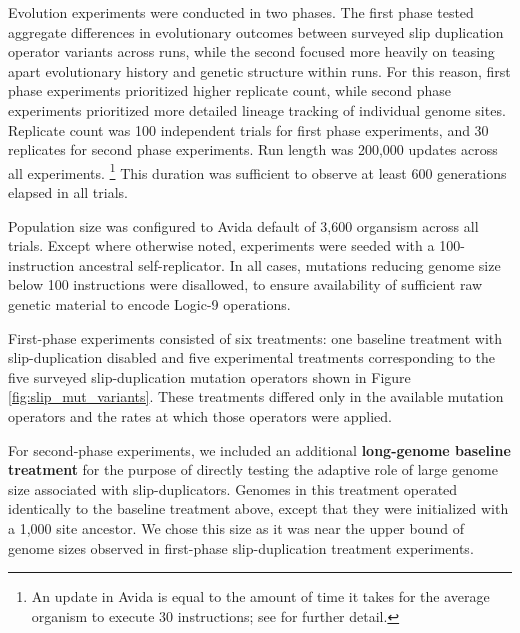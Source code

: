 Evolution experiments were conducted in two phases.
The first phase tested aggregate differences in evolutionary outcomes between surveyed slip duplication operator variants across runs, while the second focused more heavily on teasing apart evolutionary history and genetic structure within runs.
For this reason, first phase experiments prioritized higher replicate count, while second phase experiments prioritized more detailed lineage tracking of individual genome sites.
Replicate count was 100 independent trials for first phase experiments, and 30 replicates for second phase experiments.
Run length was 200,000 updates across all experiments.
\footnote{An update in Avida is equal to the amount of time it takes for the average organism to execute 30 instructions; see \citep{Ofria:2009avida} for further detail.}
This duration was sufficient to observe at least 600 generations elapsed in all trials.

Population size was configured to Avida default of 3,600 organsism across all trials.
Except where otherwise noted, experiments were seeded with a 100-instruction ancestral self-replicator.
In all cases, mutations reducing genome size below 100 instructions were disallowed, to ensure availability of sufficient raw genetic material to encode Logic-9 operations.

% 

First-phase experiments consisted of six treatments: one baseline treatment with slip-duplication disabled and five experimental treatments corresponding to the five surveyed slip-duplication mutation operators shown in Figure \ref{fig:slip_mut_variants}.
These treatments differed only in the available mutation operators and the rates at which those operators were applied.


For second-phase experiments, we included an additional \textbf{long-genome baseline treatment} for the purpose of directly testing the adaptive role of large genome size associated with slip-duplicators.
Genomes in this treatment operated identically to the baseline treatment above, except that they were initialized with a 1,000 site ancestor.
We chose this size as it was near the upper bound of genome sizes observed in first-phase slip-duplication treatment experiments.

